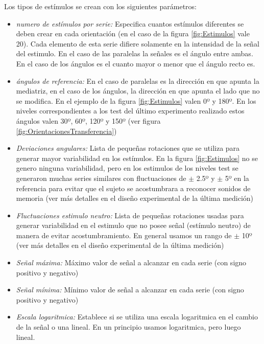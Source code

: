 \documentclass{article}
\begin{document}
    
    Los tipos de estímulos se crean con los siguientes parámetros: 
    \begin{itemize}
        \item \textit{numero de estímulos por serie:} Especifica cuantos estímulos diferentes se deben crear en cada orientación (en el caso de la figura \ref{fig:Estimulos} vale 20). Cada elemento de esta serie difiere solamente en la intensidad de la señal del estimulo. En el caso de las paralelas la señales es el ángulo entre ambas. En el caso de los ángulos es el cuanto mayor o menor que el ángulo recto es.
        \item \textit{ángulos de referencia:} En el caso de paralelas es la dirección en que apunta la mediatriz, en el caso de los ángulos, la dirección en que apunta el lado que no se modifica. En el ejemplo de la figura \ref{fig:Estimulos} valen 0º y 180º. En los niveles correspondientes a los test del último experimento realizado estos ángulos valen 30º, 60º, 120º y 150º (ver figura \ref{fig:OrientacionesTransferencia}) 
        \item \textit{Deviaciones angulares:} Lista de pequeñas rotaciones que se utiliza para generar mayor variabilidad en los estímulos. En la figura \ref{fig:Estimulos} no se genero ninguna variabilidad, pero en los estimulos de los niveles test se generaron muchas series similares con fluctuaciones de $\pm$ 2.5º y $\pm$ 5º en la referencia para evitar que el sujeto se acostumbrara a reconocer sonidos de memoria (ver más detalles en el diseño experimental de la última medición)
        \item \textit{Fluctuaciones estimulo neutro:} Lista de pequeñas rotaciones usadas para generar variabilidad en el estimulo que no posee señal (estímulo neutro) de manera de evitar acostumbramiento. En general usamos un rango de $\pm$ 10º  (ver más detalles en el diseño experimental de la última medición)
        \item \textit{Señal máxima:} Máximo valor de señal a alcanzar en cada serie (con signo positivo y negativo)
        \item \textit{Señal mínima:} Mínimo valor de señal a alcanzar en cada serie (con signo positivo y negativo)
        \item \textit{Escala logaritmica:} Establece si se utiliza una escala logaritmica en el cambio de la señal o una lineal. En un principio usamos logaritmica, pero luego lineal. 
    \end{itemize}
    
\end{document}
